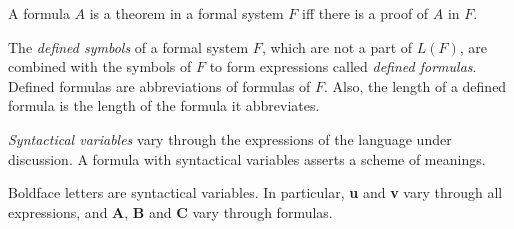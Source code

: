 \begin{fact}
    A formula $A$ is a theorem in a formal system $F$ iff there is a proof of $A$ in $F$.
\end{fact}

\begin{definition}
    The \emph{defined symbols} of a formal system $F$, which are not a part of $L(F)$, are
    combined with the symbols of $F$ to form expressions called \emph{defined formulas}.
    Defined formulas are abbreviations of formulas of $F$. Also, the length of a defined formula
    is the length of the formula it abbreviates.
\end{definition}

\begin{definition}
    \emph{Syntactical variables} vary through the expressions of the language under discussion.
    A formula with syntactical variables asserts a scheme of meanings.
\end{definition}

\begin{convention}
    Boldface letters are syntactical variables. In particular, \textbf{u} and \textbf{v}
    vary through all expressions, and \textbf{A}, \textbf{B} and \textbf{C} vary through formulas.
\end{convention}